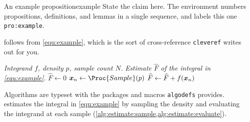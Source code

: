\documentclass[acmtog,anonymous,review]{acmart}
\begin{document}
\begin{prp}{An example proposition}{example}
	State the claim here. The environment numbers propositions, definitions, and lemmas in a single sequence, and labels this one \texttt{pro:example}.
\end{prp}

 follows from \cref{equ:example}, which is the sort of cross-reference \texttt{cleveref} writes out for you.

\begin{algorithm}[t]
	\caption{$(f, p, N)$}
	\label{alg:estimate}
	\begin{algorithmic}[1]
		\Require \textit{Integrand $f$, density $p$, sample count $N$.}
		\Ensure \textit{Estimate $\widehat{F}$ of the integral in \cref{equ:example}.}
		\State $\widehat{F} \gets 0$
			\ENDCOMMENT
			\State $\bm{x}_n \gets \Proc{Sample}(p)$ \label{alg:estimate:sample}
			\ENDCOMMENT
			\State $\widehat{F} \gets \widehat{F} + f \lparen\bm{x}_n\rparen$ \label{alg:estimate:evaluate}
		\ENDFORDO
		\RETURN[$\widehat{F} / N$]\ENDRETURN
	\end{algorithmic}
\end{algorithm}

Algorithms are typeset with the packages and macros \texttt{algodefs} provides.  estimates the integral in \cref{equ:example} by sampling the density and evaluating the integrand at each sample (\cref{alg:estimate:sample,alg:estimate:evaluate}).



\end{document}
